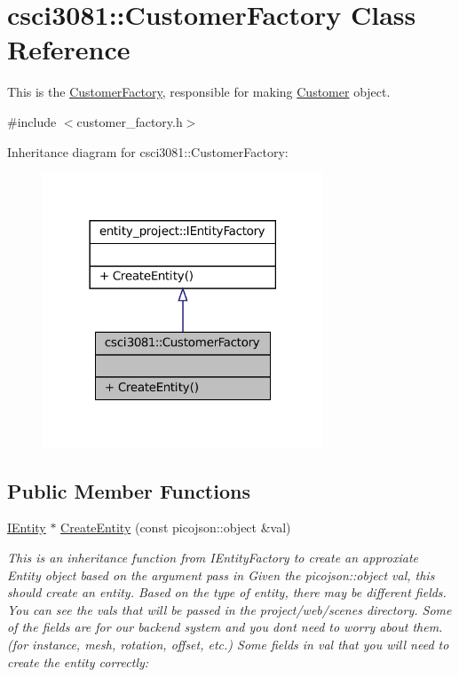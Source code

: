\hypertarget{classcsci3081_1_1CustomerFactory}{}\section{csci3081\+:\+:Customer\+Factory Class Reference}
\label{classcsci3081_1_1CustomerFactory}


This is the \hyperlink{classcsci3081_1_1CustomerFactory}{Customer\+Factory}, responsible for making \hyperlink{classcsci3081_1_1Customer}{Customer} object.  




{\ttfamily \#include $<$customer\+\_\+factory.\+h$>$}



Inheritance diagram for csci3081\+:\+:Customer\+Factory\+:
\nopagebreak
\begin{figure}[H]
\begin{center}
\leavevmode
\includegraphics[width=237pt]{classcsci3081_1_1CustomerFactory__inherit__graph}
\end{center}
\end{figure}
\subsection*{Public Member Functions}
\begin{DoxyCompactItemize}
\item 
\hyperlink{classentity__project_1_1IEntity}{I\+Entity} $\ast$ \hyperlink{classcsci3081_1_1CustomerFactory_ad184f214fa10ad531e1ae2432142fc45}{Create\+Entity} (const picojson\+::object \&val)
\begin{DoxyCompactList}\small\item\em This is an inheritance function from I\+Entity\+Factory to create an approxiate Entity object based on the argument pass in Given the picojson\+::object val, this should create an entity. Based on the type of entity, there may be different fields. You can see the vals that will be passed in the project/web/scenes directory. Some of the fields are for our backend system and you don\textquotesingle{}t need to worry about them. (for instance, mesh, rotation, offset, etc.) Some fields in val that you will need to create the entity correctly\+: \end{DoxyCompactList}\end{DoxyCompactItemize}


